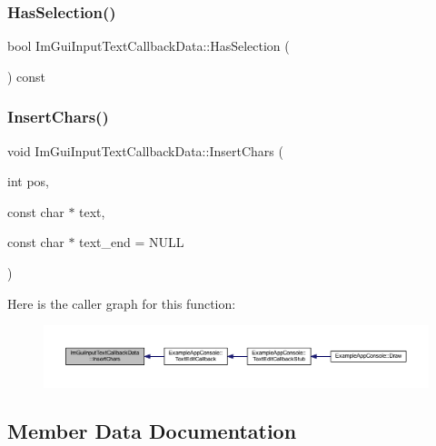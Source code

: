 \subsubsection{\texorpdfstring{Has\+Selection()}{HasSelection()}}
{\footnotesize\ttfamily bool Im\+Gui\+Input\+Text\+Callback\+Data\+::\+Has\+Selection (\begin{DoxyParamCaption}{ }\end{DoxyParamCaption}) const\hspace{0.3cm}{\ttfamily [inline]}}

\mbox{\label{struct_im_gui_input_text_callback_data_a9963937f48aba00466c2af404dad1e25}} 
\subsubsection{\texorpdfstring{Insert\+Chars()}{InsertChars()}}
{\footnotesize\ttfamily void Im\+Gui\+Input\+Text\+Callback\+Data\+::\+Insert\+Chars (\begin{DoxyParamCaption}\item[{int}]{pos,  }\item[{const char $\ast$}]{text,  }\item[{const char $\ast$}]{text\+\_\+end = {\ttfamily NULL} }\end{DoxyParamCaption})}

Here is the caller graph for this function\+:
\nopagebreak
\begin{figure}[H]
\begin{center}
\leavevmode
\includegraphics[width=350pt]{struct_im_gui_input_text_callback_data_a9963937f48aba00466c2af404dad1e25_icgraph}
\end{center}
\end{figure}


\subsection{Member Data Documentation}
\mbox{\label{struct_im_gui_input_text_callback_data_ac8cd46c3473851c2822aae8240289069}} 
